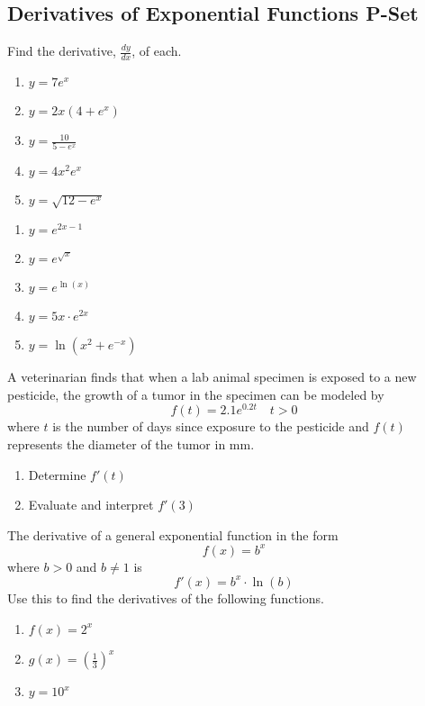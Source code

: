 \documentclass{article}
\newcounter{pset}
\begin{document}
\subsection*{Derivatives of Exponential Functions P-Set}

Find the derivative, $\frac{dy}{dx}$, of each.
\begin{multicols}{5}
\begin{enumerate}
    \item $y = 7e^x$
    \item $y = 2x(4+e^x)$
    \item $y = \frac{10}{5-e^x}$
    \item $y = 4x^2e^x$
    \item $y = \sqrt{12-e^x}$
\end{enumerate}     \setcounter{pset}{\value{enumi}}
\end{multicols}
\begin{multicols}{5}
\begin{enumerate}   \setcounter{enumi}{\value{pset}}
    \item $y = e^{2x-1}$
    \item $y = e^{\sqrt{x}}$
    \item $y = e^{\ln(x)}$
    \item $y = 5x \cdot e^{2x}$
    \item $y = \ln\left(x^2 + e^{-x}\right)$
\end{enumerate}     \setcounter{pset}{\value{enumi}}
\end{multicols}

A veterinarian finds that when a lab animal specimen is exposed to a new pesticide, the growth of a tumor in the specimen can be modeled by 
\[
f(t) = 2.1e^{0.2t} \quad t > 0
\]
where $t$ is the number of days since exposure to the pesticide and $f(t)$ represents the diameter of the tumor in mm.
\begin{enumerate}   \setcounter{enumi}{\value{pset}}
    \item Determine $f'(t)$
    \item Evaluate and interpret $f'(3)$
\end{enumerate}     \setcounter{pset}{\value{enumi}}
\bigskip 

The derivative of a general exponential function in the form
\[
f(x) = b^x
\]
where $b > 0$ and $b \neq 1$ is 
\[
f'(x) = b^x \cdot \ln(b)
\]
Use this to find the derivatives of the following functions. 
\begin{multicols}{3}
\begin{enumerate}   \setcounter{enumi}{\value{pset}}
    \item $f(x) = 2^x$
    \item $g(x) = \left(\frac{1}{3}\right)^x$
    \item $y = 10^x$
\end{enumerate}     \setcounter{pset}{\value{enumi}}
\end{multicols}
\end{document}
